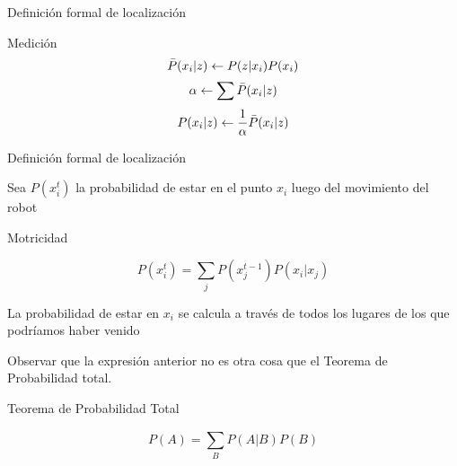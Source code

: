 \begin{frame}{Definición formal de localización}
	
	\begin{block}{Medición}
		\begin{displaymath}
			\Bar{P}(x_{i}|z) \leftarrow P(z|x_{i}) P(x_{i})
		\end{displaymath}
		\begin{displaymath}
			\alpha \leftarrow \sum \Bar{P}(x_{i}|z)
		\end{displaymath}
		\begin{displaymath}
			P(x_{i}|z) \leftarrow \frac{1}{\alpha} \Bar{P}(x_{i}|z)
		\end{displaymath}
		
	\end{block}
	
\end{frame}

\begin{frame}{Definición formal de localización}
	
	Sea $P(x_{i}^{t})$ la probabilidad de estar en el punto $x_{i}$ luego del movimiento del robot
	
	\begin{block}{Motricidad}
		
		\begin{displaymath}
			P(x_{i}^{t}) = \sum_{j} P(x_{j}^{t-1}) P(x_{i}|x_{j})
		\end{displaymath}
		
	\end{block}
	
	La probabilidad de estar en $x_{i}$ se calcula a través de todos los lugares de los que podríamos haber venido
	
	Observar que la expresión anterior no es otra cosa que el Teorema de Probabilidad total.
	
	\begin{block}{Teorema de Probabilidad Total}
		
		\begin{displaymath}
			P(A) = \sum_{B}^{}P(A|B) P(B)
		\end{displaymath}
		
	\end{block}
	
\end{frame}